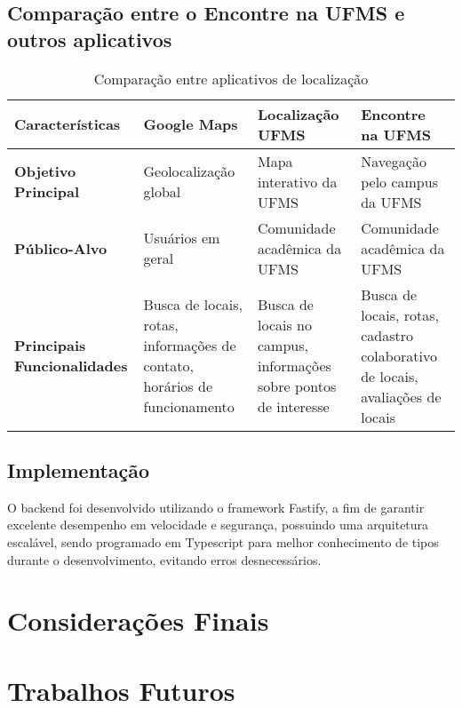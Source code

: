 \documentclass[12pt]{article}
\begin{document}
\subsection{Comparação entre o Encontre na UFMS e outros aplicativos}
\begin{table}[h]
\begin{tabularx}{\textwidth}{|X|X|X|X|}
\hline
\textbf{Características} & \textbf{Google Maps} & \textbf{Localização UFMS} & \textbf{Encontre na UFMS} \\ \hline
\textbf{Objetivo Principal} & Geolocalização global & Mapa interativo da UFMS & Navegação pelo campus da UFMS \\ \hline
\textbf{Público-Alvo} & Usuários em geral & Comunidade acadêmica da UFMS & Comunidade acadêmica da UFMS \\ \hline
\textbf{Principais Funcionalidades} & Busca de locais, rotas, informações de contato, horários de funcionamento & Busca de locais no campus, informações sobre pontos de interesse & Busca de locais, rotas, cadastro colaborativo de locais, avaliações de locais \\ \hline
\end{tabularx}
\caption{Comparação entre aplicativos de localização}
\footnotesize  {}
\label{tab:comparacao-aplicativos}
\end{table}

\subsection{Implementação}


O backend foi desenvolvido utilizando o framework Fastify, a fim de garantir excelente desempenho em velocidade e segurança, possuindo uma arquitetura escalável, sendo programado em Typescript para melhor conhecimento de tipos durante o desenvolvimento, evitando erros desnecessários.

\section{Considerações Finais}
\section{Trabalhos Futuros}
\end{document}
